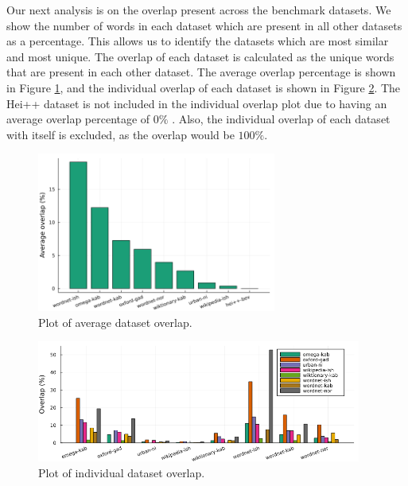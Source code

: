 
Our next analysis is on the overlap present across the benchmark datasets. We
show the number of words in each dataset which are present in all other datasets
as a percentage. This allows us to identify the datasets which are most similar
and most unique. The overlap of each dataset is calculated as the unique words
that are present in each other dataset. The average overlap percentage is shown
in Figure \ref{fig:avg_overlap}, and the individual overlap of each dataset is
shown in Figure \ref{fig:overlap_all}. The Hei++ dataset is not included in the
individual overlap plot due to having an average overlap percentage of $0\%$
\cite{bevilacqua_generationary_2020}. Also, the individual overlap of each
dataset with itself is excluded, as the overlap would be $100\%$.

\begin{figure}
    \centering
    \includegraphics[width=0.7\textwidth]{assets/plots/avg_overlap.png}
    \caption{Plot of average dataset overlap.}
    \label{fig:avg_overlap}
\end{figure}

\begin{figure}
    \centering
    \includegraphics[width=0.95\textwidth]{assets/plots/overlap_all.png}
    \caption{Plot of individual dataset overlap.}
    \label{fig:overlap_all}
\end{figure}

